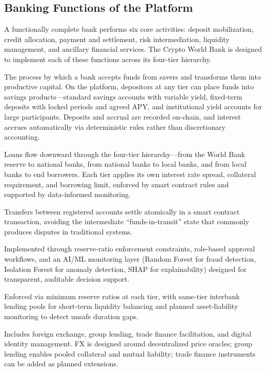 \documentclass[12pt,a4paper]{report}  %
\begin{document}
\subsection{Banking Functions of the Platform}

A functionally complete bank performs six core activities: deposit mobilization, credit allocation, payment and settlement, risk intermediation, liquidity management, and ancillary financial services. The Crypto World Bank is designed to implement each of these functions across its four-tier hierarchy.

\begin{description}[leftmargin=0pt]
\item[\textbf{Deposit Mobilization.}] The process by which a bank accepts funds from savers and transforms them into productive capital. On the platform, depositors at any tier can place funds into savings products---standard savings accounts with variable yield, fixed-term deposits with locked periods and agreed APY, and institutional yield accounts for large participants. Deposits and accrual are recorded on-chain, and interest accrues automatically via deterministic rules rather than discretionary accounting.
\item[\textbf{Credit Allocation.}] Loans flow downward through the four-tier hierarchy---from the World Bank reserve to national banks, from national banks to local banks, and from local banks to end borrowers. Each tier applies its own interest rate spread, collateral requirement, and borrowing limit, enforced by smart contract rules and supported by data-informed monitoring.
\item[\textbf{Payment and Settlement.}] Transfers between registered accounts settle atomically in a smart contract transaction, avoiding the intermediate ``funds-in-transit'' state that commonly produces disputes in traditional systems.
\item[\textbf{Risk Intermediation.}] Implemented through reserve-ratio enforcement constraints, role-based approval workflows, and an AI/ML monitoring layer (Random Forest for fraud detection, Isolation Forest for anomaly detection, SHAP for explainability) designed for transparent, auditable decision support.
\item[\textbf{Liquidity Management.}] Enforced via minimum reserve ratios at each tier, with same-tier interbank lending pools for short-term liquidity balancing and planned asset-liability monitoring to detect unsafe duration gaps.
\item[\textbf{Ancillary Financial Services.}] Includes foreign exchange, group lending, trade finance facilitation, and digital identity management. FX is designed around decentralized price oracles; group lending enables pooled collateral and mutual liability; trade finance instruments can be added as planned extensions.
\end{description}
\end{document}
